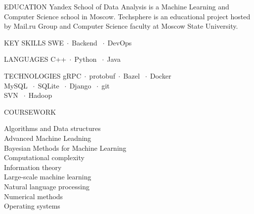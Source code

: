 \documentclass[12pt]{cutecv}
\author{Svyatoslav Feldsherov}
\newcommand{\listbullet}{$\; \cdot \;$}
\begin{document}
\maketitle

\begin{paracol}{2}
\setlength{\columnsep}{2em}

\begin{cvsection}{EDUCATION}
    {Yandex School of Data Analysis is a Machine Learning
     and Computer Science school in Moscow.}
   {Techsphere is an educational project hosted
    by Mail.ru Group and Computer Science faculty
    at Moscow State University.}
\end{cvsection}

\begin{leftcolumn}
\begin{cvsection}{KEY SKILLS}
   SWE\listbullet Backend \listbullet DevOps
\end{cvsection}

\begin{cvsection}{LANGUAGES}
  C++\listbullet Python \listbullet Java
\end{cvsection}
\begin{cvsection}{TECHNOLOGIES}
  gRPC\listbullet protobuf\listbullet Bazel \listbullet Docker \\
  MySQL \listbullet SQLite \listbullet Django \listbullet git \\
  SVN \listbullet Hadoop \\
\end{cvsection}

\begin{cvsection}{COURSEWORK}

  {\HLight
    Algorithms and Data structures\\
    Advanced Machine Leadning\\
    Bayesian Methods for Machine Learning\\
    Computational complexity\\
    Information theory\\
    Large-scale machine learning\\
    Natural language processing\\
    Numerical methods\\
    Operating systems\\
  }
\end{cvsection}


\end{leftcolumn}
\end{paracol}
\end{document}

